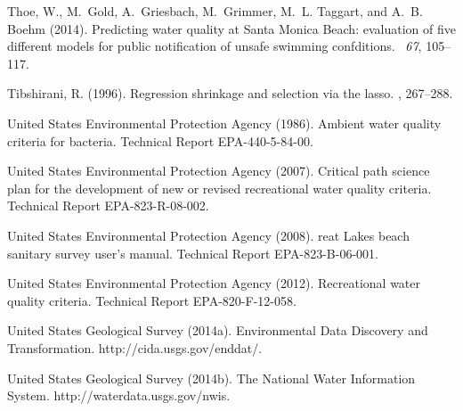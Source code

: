 \documentclass[authoryear,review, 12pt]{elsarticle}
\begin{document}
\begin{thebibliography}{}
Thoe, W., M.~Gold, A.~Griesbach, M.~Grimmer, M.~L. Taggart, and A.~B. Boehm
  (2014).
\newblock Predicting water quality at {S}anta {M}onica {B}each: evaluation of
  five different models for public notification of unsafe swimming confditions.
~{\em 67}, 105--117.

Tibshirani, R. (1996).
\newblock Regression shrinkage and selection via the lasso.
, 267--288.

{United States Environmental Protection Agency} (1986).
\newblock Ambient water quality criteria for bacteria.
\newblock Technical Report EPA-440-5-84-00.

{United States Environmental Protection Agency} (2007).
\newblock Critical path science plan for the development of new or revised
  recreational water quality criteria.
\newblock Technical Report EPA-823-R-08-002.

{United States Environmental Protection Agency} (2008).
reat {L}akes beach sanitary survey user's manual.
\newblock Technical Report EPA-823-B-06-001.

{United States Environmental Protection Agency} (2012).
\newblock Recreational water quality criteria.
\newblock Technical Report EPA-820-F-12-058.

{United States Geological Survey} (2014a).
\newblock Environmental {D}ata {D}iscovery and {T}ransformation.
\newblock http://cida.usgs.gov/enddat/.

{United States Geological Survey} (2014b).
\newblock The {N}ational {W}ater {I}nformation {S}ystem.
\newblock http://waterdata.usgs.gov/nwis.


\end{thebibliography}
\end{document}
